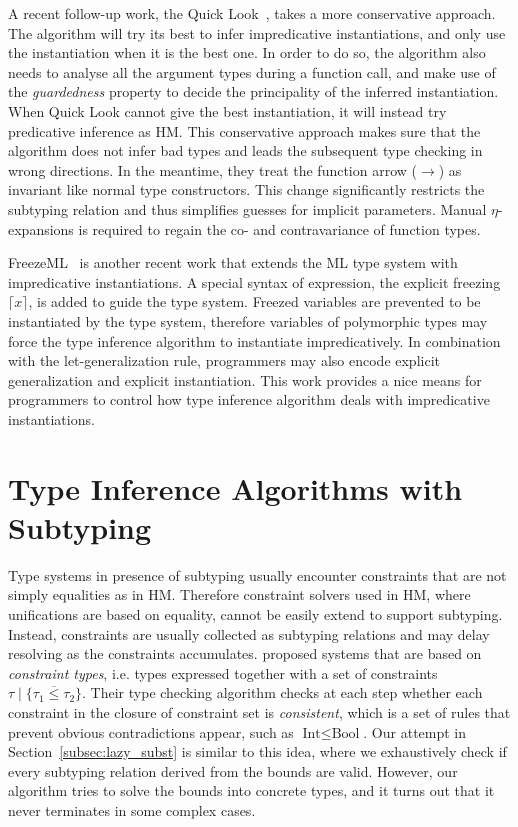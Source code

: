A recent follow-up work, the Quick Look~\citep{quicklook2020},
takes a more conservative approach.
The algorithm will try its best to infer impredicative instantiations,
and only use the instantiation when it is the best one.
In order to do so,
the algorithm also needs to analyse all the argument types during a function call,
and make use of the \emph{guardedness} property to decide the principality of
the inferred instantiation.
When Quick Look cannot give the best instantiation,
it will instead try predicative inference as HM.
This conservative approach makes sure that the algorithm does not infer bad types
and leads the subsequent type checking in wrong directions.
In the meantime, they treat the function arrow ($\to$)
as invariant like normal type constructors.
This change significantly restricts the subtyping relation and thus
simplifies guesses for implicit parameters.
Manual $\eta$-expansions is required to regain
the co- and contravariance of function types.

FreezeML~\citep{FreezeML} is another recent work that extends the ML type system
with impredicative instantiations.
A special syntax of expression, the explicit freezing $\lceil x \rceil$,
is added to guide the type system.
Freezed variables are prevented to be instantiated by the type system,
therefore variables of polymorphic types may force the type inference algorithm
to instantiate impredicatively.
In combination with the let-generalization rule, programmers may also encode
explicit generalization and explicit instantiation.
This work provides a nice means for programmers to control how type inference algorithm
deals with impredicative instantiations.

\section{Type Inference Algorithms with Subtyping}
Type systems in presence of subtyping usually encounter constraints that
are not simply equalities as in HM.
Therefore constraint solvers used in HM, where unifications are based on equality,
cannot be easily extend to support subtyping.
Instead, constraints are usually collected as subtyping relations
and may delay resolving as the constraints accumulates.
\citet{EIFRIG1995,Eifrig1995sound} proposed systems that are based on
\emph{constraint types}, i.e. types expressed together with a set of constraints
$\tau \mid \{\overline{\tau_1 \le \tau_2}\}$.
Their type checking algorithm checks at each step whether
each constraint in the closure of constraint set is \emph{consistent},
which is a set of rules that prevent obvious contradictions appear,
such as $\text{Int} \le \text{Bool}$.
Our attempt in Section~\ref{subsec:lazy_subst} is similar to this idea,
where we exhaustively check if every subtyping relation derived from the bounds are valid.
However, our algorithm tries to solve the bounds into concrete types,
and it turns out that it never terminates in some complex cases.

